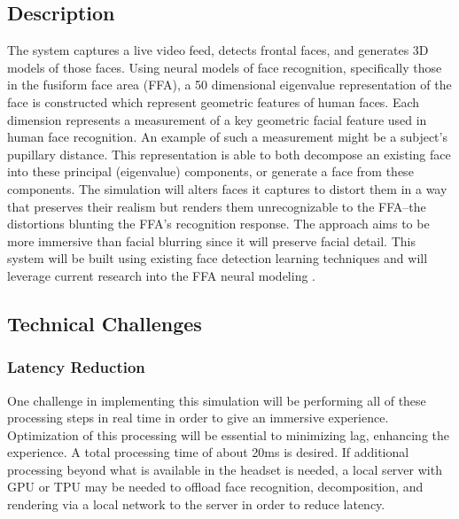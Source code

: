 \documentclass{article}
\begin{document}
    \subsection{Description}
    The system captures a live video feed, detects frontal faces, and generates 3D models of those faces. Using neural models of face recognition, specifically those in the fusiform face area (FFA), a 50 dimensional eigenvalue representation of the face is constructed \cite{chang_2017} which represent geometric features of human faces. Each dimension represents a measurement of a key geometric facial feature used in human face recognition. An example of such a measurement might be a subject's pupillary distance. This representation is able to both decompose an existing face into these principal (eigenvalue) components, or generate a face from these components. The simulation will alters faces it captures to distort them in a way that preserves their realism but renders them unrecognizable to the FFA--the distortions blunting the FFA's recognition response. The approach aims to be more immersive than facial blurring since it will preserve facial detail. This system will be built using existing face detection learning techniques and will leverage current research into the FFA neural modeling \cite{chang_2017}.

    \subsection{Technical Challenges}
    
    \subsubsection{Latency Reduction}
    One challenge in implementing this simulation will be performing all of these processing steps in real time in order to give an immersive experience. Optimization of this processing will be essential to minimizing lag, enhancing the experience. A total processing time of about 20ms is desired. \cite{hazarika_2023} If additional processing beyond what is available in the headset is needed, a local server with GPU or TPU may be needed to offload face recognition, decomposition, and rendering via a local network to the server in order to reduce latency.
\end{document}
